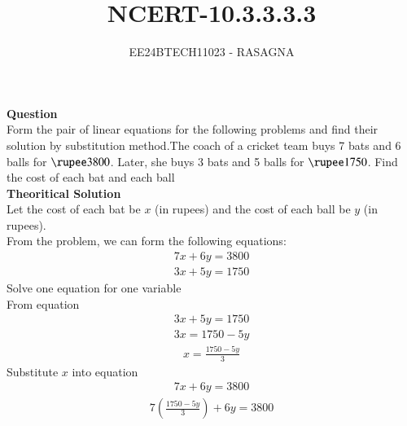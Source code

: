 \documentclass[journal]{IEEEtran}
\begin{document}

\vspace{3cm}

\title{NCERT-10.3.3.3.3}
\author{EE24BTECH11023 - RASAGNA}

{\let\newpage\relax\maketitle}

\renewcommand{\thefigure}{\theenumi}
\renewcommand{\thetable}{\theenumi}
\setlength{\intextsep}{10pt} %


\renewcommand{\thetable}{\theenumi}
\textbf{Question}\\
Form the pair of linear equations for the following problems and find their solution by
substitution method.The coach of a cricket team buys 7 bats and 6 balls for \(\text{\rupee} 3800\). Later, she buys 3 bats and 5 balls for \(\text{\rupee} 1750\). Find the cost of each bat and each ball\\
\textbf{Theoritical Solution}\\
Let the cost of each bat be \(x\) (in rupees) and the cost of each ball be \(y\) (in rupees).\\
From the problem, we can form the following equations:
\begin{align}
    7x + 6y = 3800 
\end{align}
\begin{align}
        3x + 5y = 1750 
\end{align}
Solve one equation for one variable\\
From equation 
\begin{align}
    3x + 5y = 1750 
\end{align}
\begin{align}
        3x = 1750 - 5y
\end{align}
\begin{align}
        x = \frac{1750 - 5y}{3} 
\end{align}
Substitute \(x\) into equation 
\begin{align}
    7x + 6y = 3800
\end{align}
\begin{align}
        7 \left( \frac{1750 - 5y}{3} \right) + 6y= 3800 
\end{align}
\end{document}
